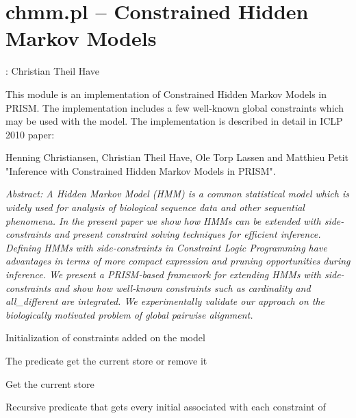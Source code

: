 


\section{chmm.pl -- Constrained Hidden Markov Models}

\label{sec:chmm}

\begin{tags}
: Christian Theil Have
\end{tags}

This module is an implementation of Constrained Hidden Markov Models in PRISM. The implementation includes
a few well-known global constraints which may be used with the model. The implementation is described in detail in
ICLP 2010 paper:

Henning Christiansen, Christian Theil Have, Ole Torp Lassen and Matthieu Petit
"Inference with Constrained Hidden Markov Models in PRISM".

\textit{Abstract: A Hidden Markov Model (HMM) is a common statistical model which is widely used for analysis
of biological sequence data and other sequential phenomena. In the present paper we show how HMMs can
be extended with side-constraints and present constraint solving techniques for efficient inference.
Defining HMMs with side-constraints in Constraint Logic Programming have advantages in terms of more compact
expression and pruning opportunities during inference. We present a PRISM-based framework for extending HMMs
with side-constraints and show how well-known constraints such as cardinality and all_different are integrated.
We experimentally validate our approach on the biologically motivated problem of global pairwise alignment.}\vspace{0.7cm}

\begin{description}
Initialization of constraints added on the model

The predicate get the current store or remove it

Get the current store

Recursive predicate that gets every initial  associated
with each constraint of 
\end{description}

